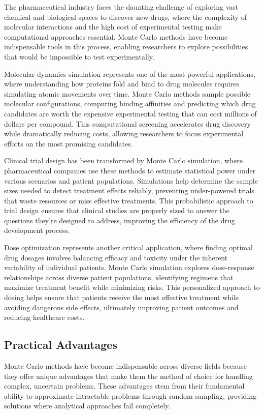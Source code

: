 The pharmaceutical industry faces the daunting challenge of exploring vast chemical and biological spaces to discover new drugs, where the complexity of molecular interactions and the high cost of experimental testing make computational approaches essential. Monte Carlo methods have become indispensable tools in this process, enabling researchers to explore possibilities that would be impossible to test experimentally.

Molecular dynamics simulation represents one of the most powerful applications, where understanding how proteins fold and bind to drug molecules requires simulating atomic movements over time. Monte Carlo methods sample possible molecular configurations, computing binding affinities and predicting which drug candidates are worth the expensive experimental testing that can cost millions of dollars per compound. This computational screening accelerates drug discovery while dramatically reducing costs, allowing researchers to focus experimental efforts on the most promising candidates.

Clinical trial design has been transformed by Monte Carlo simulation, where pharmaceutical companies use these methods to estimate statistical power under various scenarios and patient populations. Simulations help determine the sample sizes needed to detect treatment effects reliably, preventing under-powered trials that waste resources or miss effective treatments. This probabilistic approach to trial design ensures that clinical studies are properly sized to answer the questions they're designed to address, improving the efficiency of the drug development process.

Dose optimization represents another critical application, where finding optimal drug dosages involves balancing efficacy and toxicity under the inherent variability of individual patients. Monte Carlo simulation explores dose-response relationships across diverse patient populations, identifying regimens that maximize treatment benefit while minimizing risks. This personalized approach to dosing helps ensure that patients receive the most effective treatment while avoiding dangerous side effects, ultimately improving patient outcomes and reducing healthcare costs.

\subsection{Practical Advantages}

Monte Carlo methods have become indispensable across diverse fields because they offer unique advantages that make them the method of choice for handling complex, uncertain problems. These advantages stem from their fundamental ability to approximate intractable problems through random sampling, providing solutions where analytical approaches fail completely.

